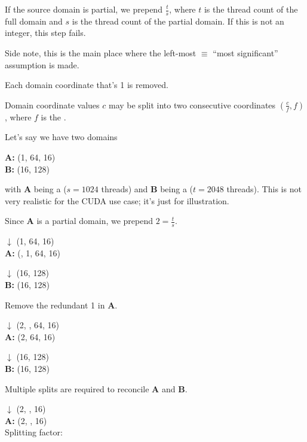 \filbreak
{} If the source domain is partial, we prepend $\frac{t}{s}$, where $t$ is the thread count of the full domain and $s$ is the thread count of the partial domain.
If this is not an integer, this step fails.

Side note, this is the main place where the left-most $\equiv$ ``most significant'' assumption is made.

\filbreak
{} Each domain coordinate that's 1 is removed.

\filbreak
{} Domain coordinate values $c$ may be split into two consecutive coordinates $(\frac{c}{f}, f)$, where $f$ is the .

\filbreak
{}

Let's say we have two domains

\textbf{A:} (1, 64, 16)\\
\textbf{B:} (16, 128)

with \textbf{A} being a  ($s = 1024$ threads) and \textbf{B} being a  ($t = 2048$ threads).
This is not very realistic for the CUDA use case; it's just for illustration.

\filbreak
{} Since \textbf{A} is a partial domain, we prepend $2 = \frac{t}{s}$.

$\downarrow$ {\color{grayttColor} (1, 64, 16)} \\
\textbf{A:} (, 1, 64, 16)

$\downarrow$ {\color{grayttColor} (16, 128)} \\
\textbf{B:} (16, 128)

\filbreak
{} Remove the redundant 1 in \textbf{A}.

$\downarrow$ {\color{grayttColor} (2, , 64, 16)} \\
\textbf{A:} (2, 64, 16)

$\downarrow$ {\color{grayttColor} (16, 128)} \\
\textbf{B:} (16, 128)

\filbreak
{} Multiple splits are required to reconcile \textbf{A} and \textbf{B}.

$\downarrow$ {\color{grayttColor} (2, , 16)} \\
\textbf{A:} (2, , 16) \\
Splitting factor: 

